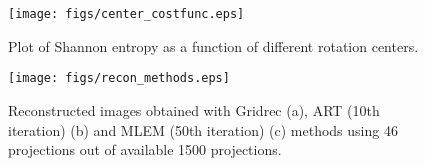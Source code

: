 \documentclass[pdf]{iucr}              %
\begin{document}
\begin{figure}
\centering
\texttt{[image: figs/center\_costfunc.eps]}
\caption{Plot of Shannon entropy as a function of different rotation centers. }
\label{fig:OptimizeCenter2}
\end{figure}


\begin{figure}
\centering
\texttt{[image: figs/recon\_methods.eps]}
\caption{Reconstructed images obtained with Gridrec (a), ART (10th iteration) (b) and MLEM (50th iteration) (c) methods using 46 projections out of available 1500 projections.}
\label{recon_methods}
\end{figure}
\end{document}
